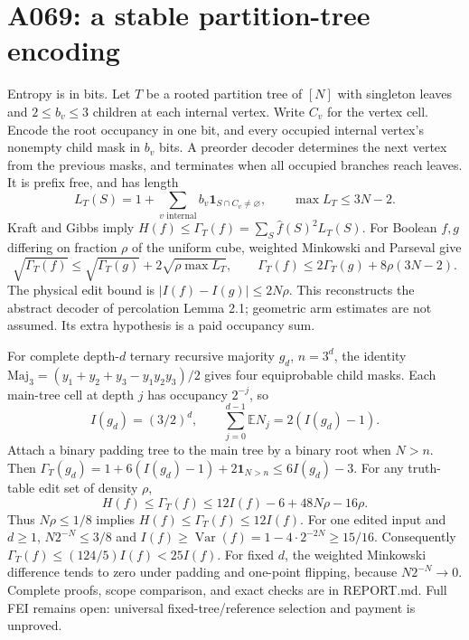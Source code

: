 \documentclass{article}
\begin{document}
\section*{A069: a stable partition-tree encoding}
Entropy is in bits. Let $T$ be a rooted partition tree of $[N]$ with singleton leaves
and $2\le b_v\le3$ children at each internal vertex. Write $C_v$ for the vertex cell.
Encode the root occupancy in one bit, and every occupied internal vertex's nonempty
child mask in $b_v$ bits. A preorder decoder determines the next vertex from the
previous masks, and terminates when all occupied branches reach leaves. It is prefix free,
and has length
\[
 L_T(S)=1+\sum_{v\text{ internal}}b_v\mathbf1_{S\cap C_v\ne\varnothing},
 \qquad \max L_T\le3N-2.
\]
Kraft and Gibbs imply $H(f)\le\Gamma_T(f)=\sum_S\widehat f(S)^2L_T(S)$.
For Boolean $f,g$ differing on fraction $\rho$ of the uniform cube,
weighted Minkowski and Parseval give
\[
 \sqrt{\Gamma_T(f)}\le\sqrt{\Gamma_T(g)}+2\sqrt{\rho\max L_T},
 \qquad
 \Gamma_T(f)\le2\Gamma_T(g)+8\rho(3N-2).
\]
The physical edit bound is $|I(f)-I(g)|\le2N\rho$.
This reconstructs the abstract decoder of percolation Lemma 2.1; geometric arm
estimates are not assumed. Its extra hypothesis is a paid occupancy sum.

For complete depth-$d$ ternary recursive majority $g_d$, $n=3^d$, the identity
$\mathrm{Maj}_3=(y_1+y_2+y_3-y_1y_2y_3)/2$ gives four equiprobable child masks.
Each main-tree cell at depth $j$ has occupancy $2^{-j}$, so
\[
 I(g_d)=(3/2)^d,\qquad
 \sum_{j=0}^{d-1}\mathbb E N_j=2(I(g_d)-1).
\]
Attach a binary padding tree to the main tree by a binary root when $N>n$.
Then $\Gamma_T(g_d)=1+6(I(g_d)-1)+2\mathbf1_{N>n}\le6I(g_d)-3$.
For any truth-table edit set of density $\rho$,
\[
 H(f)\le\Gamma_T(f)\le12I(f)-6+48N\rho-16\rho.
\]
Thus $N\rho\le1/8$ implies $H(f)\le\Gamma_T(f)\le12I(f)$.
For one edited input and $d\ge1$, $N2^{-N}\le3/8$ and
$I(f)\ge\operatorname{Var}(f)=1-4\cdot2^{-2N}\ge15/16$.
Consequently $\Gamma_T(f)\le(124/5)I(f)<25I(f)$.
For fixed $d$, the weighted Minkowski difference tends to zero under padding and
one-point flipping, because $N2^{-N}\to0$.
Complete proofs, scope comparison, and exact checks are in REPORT.md.
Full FEI remains open: universal fixed-tree/reference selection and payment is unproved.
\end{document}
